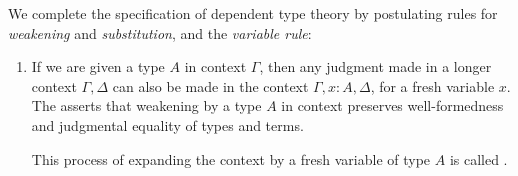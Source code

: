 We complete the specification of dependent type theory by postulating rules for \emph{weakening} and \emph{substitution}, and the \emph{variable rule}:
\begin{enumerate}
\item If we are given a type $A$ in context $\Gamma$, then any judgment made in a longer context $\Gamma,\Delta$ can also be made in the context $\Gamma,x:A,\Delta$, for a fresh variable $x$. The  asserts that weakening by a type $A$ in context preserves well-formedness and judgmental equality of types and terms.
\begin{prooftree}
\end{prooftree}
This process of expanding the context by a fresh variable of type $A$ is called .


\end{enumerate}
